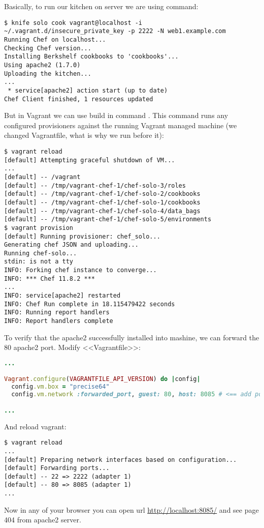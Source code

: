 Basically, to run our kitchen on server we are using  command:

\begin{lstlisting}[label=lst:my-cloud-vagrant11]
$ knife solo cook vagrant@localhost -i ~/.vagrant.d/insecure_private_key -p 2222 -N web1.example.com
Running Chef on localhost...
Checking Chef version...
Installing Berkshelf cookbooks to 'cookbooks'...
Using apache2 (1.7.0)
Uploading the kitchen...
...
 * service[apache2] action start (up to date)
Chef Client finished, 1 resources updated
\end{lstlisting}

But in Vagrant we can use build in command . This command runs any configured provisioners against the running Vagrant managed machine (we changed Vagrantfile, what is why we run  before it):

\begin{lstlisting}[label=lst:my-cloud-vagrant8]
$ vagrant reload
[default] Attempting graceful shutdown of VM...
...
[default] -- /vagrant
[default] -- /tmp/vagrant-chef-1/chef-solo-3/roles
[default] -- /tmp/vagrant-chef-1/chef-solo-2/cookbooks
[default] -- /tmp/vagrant-chef-1/chef-solo-1/cookbooks
[default] -- /tmp/vagrant-chef-1/chef-solo-4/data_bags
[default] -- /tmp/vagrant-chef-1/chef-solo-5/environments
$ vagrant provision
[default] Running provisioner: chef_solo...
Generating chef JSON and uploading...
Running chef-solo...
stdin: is not a tty
INFO: Forking chef instance to converge...
INFO: *** Chef 11.8.2 ***
...
INFO: service[apache2] restarted
INFO: Chef Run complete in 18.115479422 seconds
INFO: Running report handlers
INFO: Report handlers complete
\end{lstlisting}

To verify that the apache2 successfully installed into mashine, we can forward the 80 apache2 port. Modify <<Vagrantfile>>:

\begin{lstlisting}[language=Ruby, label=lst:my-cloud-vagrant9,title=my-cloud/nodes/Vagrantfile]
...

Vagrant.configure(VAGRANTFILE_API_VERSION) do |config|
  config.vm.box = "precise64"
  config.vm.network :forwarded_port, guest: 80, host: 8085 # <== add port forwarding

...
\end{lstlisting}

And reload vagrant:

\begin{lstlisting}[label=lst:my-cloud-vagrant10]
$ vagrant reload
...
[default] Preparing network interfaces based on configuration...
[default] Forwarding ports...
[default] -- 22 => 2222 (adapter 1)
[default] -- 80 => 8085 (adapter 1)
...
\end{lstlisting}

Now in any of your browser you can open url \href{http://localhost:8085/}{http://localhost:8085/} and see page 404 from apache2 server.

